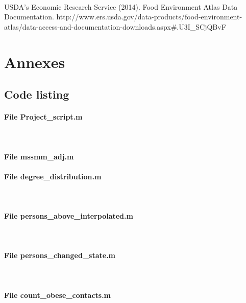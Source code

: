 \documentclass[11pt]{article}
\begin{document}
\paragraph{}
USDA's Economic Research Service (2014). Food Environment Atlas Data Documentation. http://www.ers.usda.gov/data-products/food-environment-atlas/data-access-and-documentation-downloads.aspx#.U3I_SCjQBvF

\newpage
\section{Annexes}
\subsection{Code listing}
\lstset{breaklines=true}

\paragraph{File Project\_script.m} \


\paragraph{File mssmm\_adj.m}


\paragraph{File degree\_distribution.m} \


\paragraph{File persons\_above\_interpolated.m} \


\paragraph{File persons\_changed\_state.m} \


\paragraph{File count\_obese\_contacts.m} \

\end{document}
